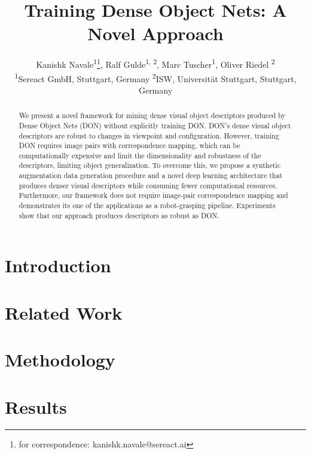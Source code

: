 \documentclass[english]{article}
\title{Training Dense Object Nets: A Novel Approach}
\author{%
  Kanishk Navale\textsuperscript{1}\thanks{for correspondence: kanishk.navale@sereact.ai}, \quad
  Ralf Gulde\textsuperscript{1, 2}, \quad
  Marc Tuscher\textsuperscript{1}, \quad
  Oliver Riedel \textsuperscript{2}\\
  \textsuperscript{1}Sereact GmbH, Stuttgart, Germany \quad
  \textsuperscript{2}ISW, Universität Stuttgart, Stuttgart, Germany\\
}
\begin{document}
\maketitle

\begin{abstract}
  We present a novel framework for mining dense visual object descriptors produced by Dense Object Nets (DON) without 
  explicitly training DON. DON's dense visual object descriptors are robust to changes in viewpoint and configuration.
  However, training DON requires image pairs with correspondence mapping, which can be computationally expensive and 
  limit the dimensionality and robustness of the descriptors, limiting object generalization. 
  To overcome this, we propose a synthetic augmentation data generation procedure and a novel deep 
  learning architecture that produces denser visual descriptors while consuming fewer computational resources. 
  Furthermore, our framework does not require image-pair correspondence mapping and demonstrates its one of the applications 
  as a robot-grasping pipeline. Experiments show that our approach produces descriptors as robust as DON.
\end{abstract}

\section{Introduction}


\section{Related Work}


\section{Methodology}


\section{Results}


\printbibliography
\end{document}
